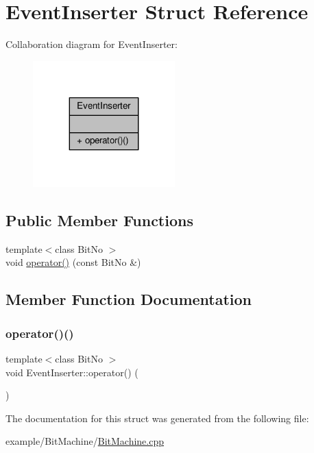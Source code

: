 \hypertarget{struct_event_inserter}{}\section{Event\+Inserter Struct Reference}
\label{struct_event_inserter}


Collaboration diagram for Event\+Inserter\+:
\nopagebreak
\begin{figure}[H]
\begin{center}
\leavevmode
\includegraphics[width=155pt]{struct_event_inserter__coll__graph}
\end{center}
\end{figure}
\subsection*{Public Member Functions}
\begin{DoxyCompactItemize}
\item 
{\footnotesize template$<$class Bit\+No $>$ }\\void \mbox{\hyperlink{struct_event_inserter_a19ede40eebc09ea7cc942e5f234cee32}{operator()}} (const Bit\+No \&)
\end{DoxyCompactItemize}


\subsection{Member Function Documentation}
\mbox{\label{struct_event_inserter_a19ede40eebc09ea7cc942e5f234cee32}} 
\subsubsection{\texorpdfstring{operator()()}{operator()()}}
{\footnotesize\ttfamily template$<$class Bit\+No $>$ \\
void Event\+Inserter\+::operator() (\begin{DoxyParamCaption}\item[{const Bit\+No \&}]{ }\end{DoxyParamCaption})\hspace{0.3cm}{\ttfamily [inline]}}



The documentation for this struct was generated from the following file\+:\begin{DoxyCompactItemize}
\item 
example/\+Bit\+Machine/\mbox{\hyperlink{_bit_machine_8cpp}{Bit\+Machine.\+cpp}}\end{DoxyCompactItemize}

